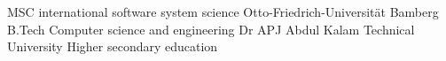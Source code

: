 %
%
%


\begin{scholarship}
					{MSC international software system science Otto-Friedrich-Universität Bamberg}
					{B.Tech Computer science and engineering Dr APJ Abdul Kalam Technical University}
					{Higher secondary education}
\end{scholarship}